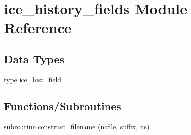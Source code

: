 \hypertarget{namespaceice__history__fields}{
\section{ice\_\-history\_\-fields Module Reference}
\label{namespaceice__history__fields}
}
\subsection*{Data Types}
\begin{DoxyCompactItemize}
\item 
type \hyperlink{typeice__history__fields_1_1ice__hist__field}{ice\_\-hist\_\-field}
\end{DoxyCompactItemize}
\subsection*{Functions/Subroutines}
\begin{DoxyCompactItemize}
\item 
subroutine \hyperlink{namespaceice__history__fields_a64420e9d3c2971300dd20fc51259f7e8}{construct\_\-filename} (ncfile, suffix, ns)
\end{DoxyCompactItemize}
